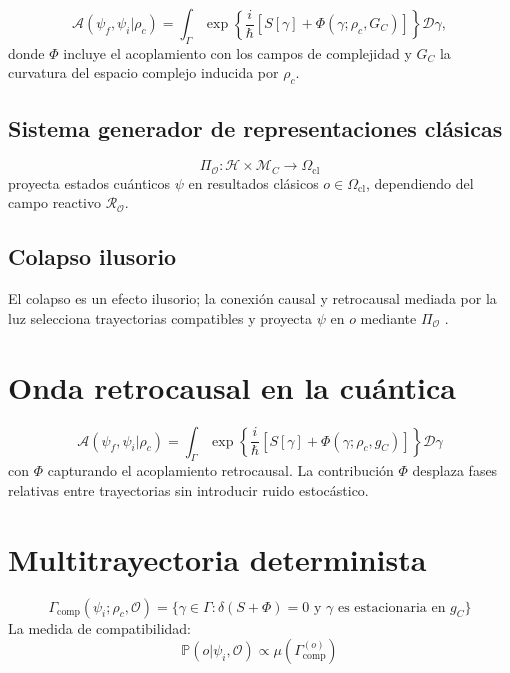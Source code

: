 \documentclass[reprint,amsmath,amssymb,aps]{revtex4-2}
\begin{document}
\begin{equation}
\mathcal{A}(\psi_f, \psi_i|\rho_c) = \int_{\Gamma} \exp\left\{\frac{i}{\hbar}\left[S[\gamma] + \Phi(\gamma;\rho_c,G_C)\right]\right\} \mathcal{D}\gamma,
\end{equation}
donde $\Phi$ incluye el acoplamiento con los campos de complejidad y $G_C$ la curvatura del espacio complejo inducida por $\rho_c$.

\subsection{Sistema generador de representaciones clásicas}
\begin{equation}
\Pi_{\mathcal{O}}: \mathcal{H} \times \mathcal{M}_C \to \Omega_{\text{cl}}
\end{equation}
proyecta estados cuánticos $\psi$ en resultados clásicos $o \in \Omega_{\text{cl}}$, dependiendo del campo reactivo $\mathcal{R}_\mathcal{O}$.

\subsection{Colapso ilusorio}
El colapso es un efecto ilusorio; la conexión causal y retrocausal mediada por la luz selecciona trayectorias compatibles y proyecta $\psi$ en $o$ mediante $\Pi_{\mathcal{O}}$ \cite{Cramer1986, Aharonov1964}.

\section{Onda retrocausal en la cuántica}
\begin{equation}
\mathcal{A}(\psi_f, \psi_i|\rho_c) = \int_{\Gamma} \exp\left\{\frac{i}{\hbar}\left[S[\gamma] + \Phi(\gamma;\rho_c,g_C)\right]\right\} \mathcal{D}\gamma
\end{equation}
con $\Phi$ capturando el acoplamiento retrocausal. La contribución $\Phi$ desplaza fases relativas entre trayectorias sin introducir ruido estocástico.

\section{Multitrayectoria determinista}
\begin{equation}
\Gamma_{\text{comp}}(\psi_i;\rho_c, \mathcal{O}) = \{\gamma \in \Gamma : \delta (S+\Phi)=0 \text{ y }\gamma \text{ es estacionaria en } g_C \}
\end{equation}
La medida de compatibilidad:
\begin{equation}
\mathbb{P}(o|\psi_i,\mathcal{O}) \propto \mu(\Gamma_{\text{comp}}^{(o)})
\end{equation}
\end{document}
